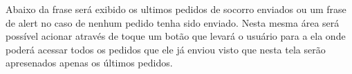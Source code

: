 Abaixo da frase será exibido os ultimos pedidos de socorro enviados ou um frase de alert no caso de nenhum pedido tenha sido enviado. Nesta mesma área será possível acionar através de toque um botão que levará o usuário para a ela onde poderá acessar todos os pedidos que ele já enviou visto que nesta tela serão apresenados apenas os últimos pedidos.

